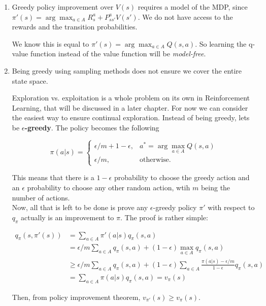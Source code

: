 \begin{enumerate}
	\item Greedy policy improvement over $V(s)$ requires a model of the MDP, since $\pi'(s) = \arg\max_{a \in A} R^a_s + P^a_{ss'} V(s')$. We do not have access to the rewards and the transition probabilities.
	
	We know this is equal to $\pi'(s) = \arg\max_{a \in A} Q(s,a)$. So learning the q-value function instead of the value function will be \textit{model-free}.
	
	\item Being greedy using sampling methods does not ensure we cover the entire state space.
	
	Exploration vs. exploitation is a whole problem on its own in Reinforcement Learning, that will be discussed in a later chapter. For now we can consider the easiest way to ensure continual exploration. Instead of being greedy, lets be \textbf{$\epsilon$-greedy}. The policy becomes the following
	
	\begin{equation}
		\pi(a | s) = \begin{cases}
			\epsilon/m + 1 - \epsilon, & a^* = \arg\max_{a \in A} Q(s, a)\\
			\epsilon/m, & \text{otherwise}.
		\end{cases}
	\end{equation}

	This means that there is a $1 - \epsilon$ probability to choose the greedy action and an $\epsilon$ probability to choose any other random action, wtih $m$ being the number of actions.\\
	
	Now, all that is left to be done is prove any $\epsilon$-greedy policy $\pi'$ with respect to $q_\pi$ actually is an improvement to $\pi$. The proof is rather simple:
	
	\begin{equation*}
		\begin{aligned}
			q_\pi(s, \pi'(s)) & = \sum_{a \in A} \pi'(a | s) q_\pi(s, a)\\
							  & = \epsilon/m \sum_{a \in A} q_\pi(s, a) + (1 - \epsilon) \max_{a \in A} q_\pi(s, a)\\
							  & \geq \epsilon/m \sum_{a \in A} q_\pi(s, a) + (1 - \epsilon) \sum_{a \in A} \frac{\pi(a|s) - \epsilon/m}{1 - \epsilon} q_\pi(s, a)\\
							  & = \sum_{a \in A} \pi(a|s) q_\pi(s, a) = v_\pi(s)
		\end{aligned}
	\end{equation*}

	Then, from policy improvement theorem, $v_{\pi'}(s) \geq v_\pi(s)$.
\end{enumerate}

